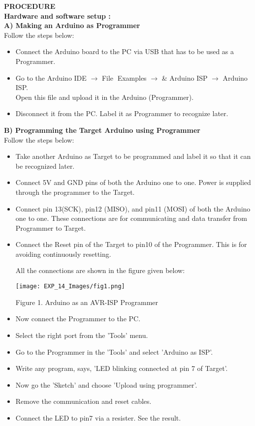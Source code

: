 \documentclass[12pt,a4paper]{article}
\begin{document}
\begin{justify}

\noindent \textbf{\large PROCEDURE}\\[3pt]
\textbf{Hardware and software setup : }\\
\textbf{A)	Making an Arduino as Programmer}\\[5pt]
Follow the steps below:\vspace{-6mm}
\begin{itemize}
\item Connect the Arduino board to the PC via USB that has to be used as a Programmer.
\item Go to the Arduino IDE $\rightarrow$ File Examples $\rightarrow$ & Arduino ISP $\rightarrow$ Arduino ISP.\\
Open this file and upload it in the Arduino (Programmer).
\item	Disconnect it from the PC. Label it as Programmer to recognize later.
\end{itemize}

\noindent \textbf{B) Programming the Target Arduino using Programmer}\\[5pt]
Follow the steps below:\vspace{-6mm}
\begin{itemize}
\item Take another Arduino as Target to be programmed and label it so that it can be recognized later.
\item Connect 5V and GND pins of both the Arduino one to one. Power is supplied through the programmer to the Target.
\item Connect pin 13(SCK), pin12 (MISO), and pin11 (MOSI) of both the Arduino one to one.
These connections are for communicating and data transfer from Programmer to Target.
\item Connect the Reset pin of the Target to pin10 of the Programmer. This is for avoiding continuously resetting. 


All the connections are shown in the figure given below:


\begin{center} 
\texttt{[image: EXP\_14\_Images/fig1.png]}
\end{center}

\begin{center} {Figure 1. Arduino as an AVR-ISP Programmer}\end{center}



\item Now connect the Programmer to the PC.
\item Select the right port from the 'Tools' menu.
\item  Go to the Programmer in the 'Tools' and select 'Arduino as ISP'.
\item  Write any program, says, 'LED blinking connected at pin 7 of Target'.
\item Now go the 'Sketch' and choose 'Upload using programmer'.
\item Remove the communication and reset cables.
\item  Connect the LED to pin7 via a resister. See the result.  
\end{itemize}


\end{justify}
\end{document}
